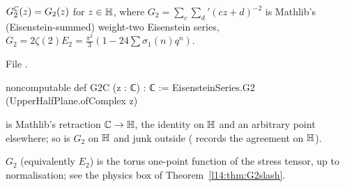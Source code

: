 \begin{definition}\label{l14:def:G2C}
$G_2^{{\mathbb{C}}}(z) = G_2(z)$ for $z\in\mathbb{H}$, where $G_2 = \sum_{c}\sum_{d}{}'(cz+d)^{-2}$ is Mathlib's (Eisenstein-summed)
weight-two Eisenstein series, $G_2 = 2\zeta(2)E_2 = \frac{\pi^2}{3}(1-24\sum\sigma_1(n)q^n)$.
\end{definition}
\noindent File .
\begin{leancode}
noncomputable def G2C (z : ℂ) : ℂ := EisensteinSeries.G2 (UpperHalfPlane.ofComplex z)
\end{leancode}
\begin{dictionary}
 is Mathlib's retraction ${\mathbb{C}}\to\mathbb{H}$, the identity on $\mathbb{H}$ and an
arbitrary point elsewhere; so  is $G_2$ on $\mathbb{H}$ and junk outside ( records the agreement
on $\mathbb{H}$).
\end{dictionary}
\begin{physics}
$G_2$ (equivalently $E_2$) is the torus one-point function of the stress tensor, up to normalisation; see the physics box of Theorem~\ref{l14:thm:G2slash}.
\end{physics}

